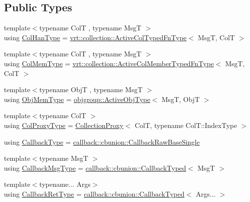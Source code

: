 \subsection*{Public Types}
\begin{DoxyCompactItemize}
\item 
{\footnotesize template$<$typename ColT , typename MsgT $>$ }\\using \hyperlink{structvt_1_1pipe_1_1_pipe_manager_t_l_a0bf4e2e805b3ce2be9f499e0e39aadfa}{Col\+Han\+Type} = \hyperlink{namespacevt_1_1vrt_1_1collection_a939327f58a5838cf9d7dcc7f14d1670c}{vrt\+::collection\+::\+Active\+Col\+Typed\+Fn\+Type}$<$ MsgT, ColT $>$
\item 
{\footnotesize template$<$typename ColT , typename MsgT $>$ }\\using \hyperlink{structvt_1_1pipe_1_1_pipe_manager_t_l_abf7ad21be4f3d0db51d643aa8ea959cc}{Col\+Mem\+Type} = \hyperlink{namespacevt_1_1vrt_1_1collection_a87925616c03cf4ccc548d33b2fe172ee}{vrt\+::collection\+::\+Active\+Col\+Member\+Typed\+Fn\+Type}$<$ MsgT, ColT $>$
\item 
{\footnotesize template$<$typename ObjT , typename MsgT $>$ }\\using \hyperlink{structvt_1_1pipe_1_1_pipe_manager_t_l_a1a8a2e05fd84f8ac7b7dda4b64e5abe5}{Obj\+Mem\+Type} = \hyperlink{namespacevt_1_1objgroup_a979bd9dc714fdacafc4b83f98271bc23}{objgroup\+::\+Active\+Obj\+Type}$<$ MsgT, ObjT $>$
\item 
{\footnotesize template$<$typename ColT $>$ }\\using \hyperlink{structvt_1_1pipe_1_1_pipe_manager_t_l_af56c58cad882496e35f01227d4da3898}{Col\+Proxy\+Type} = \hyperlink{namespacevt_a0d58a693bfb96e0ce5d145692a1a1f98}{Collection\+Proxy}$<$ ColT, typename Col\+T\+::\+Index\+Type $>$
\item 
using \hyperlink{structvt_1_1pipe_1_1_pipe_manager_t_l_a1cc1d0f1c80a36488f9b5d282e9755d2}{Callback\+Type} = \hyperlink{structvt_1_1pipe_1_1callback_1_1cbunion_1_1_callback_raw_base_single}{callback\+::cbunion\+::\+Callback\+Raw\+Base\+Single}
\item 
{\footnotesize template$<$typename MsgT $>$ }\\using \hyperlink{structvt_1_1pipe_1_1_pipe_manager_t_l_af6fc2c17f1729fa06450441b0ee81cb1}{Callback\+Msg\+Type} = \hyperlink{structvt_1_1pipe_1_1callback_1_1cbunion_1_1_callback_typed}{callback\+::cbunion\+::\+Callback\+Typed}$<$ MsgT $>$
\item 
{\footnotesize template$<$typename... Args$>$ }\\using \hyperlink{structvt_1_1pipe_1_1_pipe_manager_t_l_a456fdd18da932171fe8abab8bb213aa9}{Callback\+Ret\+Type} = \hyperlink{structvt_1_1pipe_1_1callback_1_1cbunion_1_1_callback_typed}{callback\+::cbunion\+::\+Callback\+Typed}$<$ Args... $>$

\end{DoxyCompactItemize}
